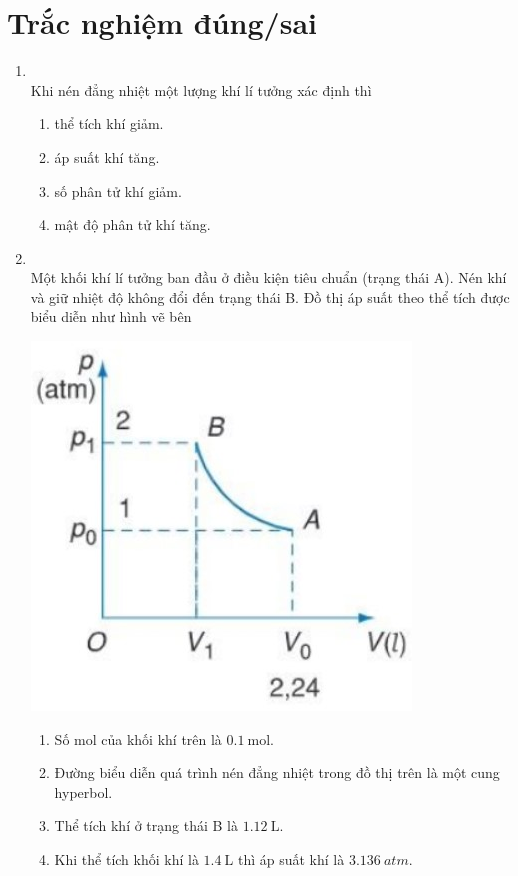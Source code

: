 \section{Trắc nghiệm đúng/sai}
\begin{enumerate}[label=\bfseries Câu \arabic*:, leftmargin=1.7cm]
	\item {}\\
	Khi nén đẳng nhiệt một lượng khí lí tưởng xác định thì
	\begin{enumerate}[label=\alph*)]
		\item thể tích khí giảm.
		\item áp suất khí tăng.
		\item số phân tử khí giảm.
		\item mật độ phân tử khí tăng.
	\end{enumerate}

\item{}\\
Một khối khí lí tưởng ban đầu ở điều kiện tiêu chuẩn (trạng thái A). Nén khí và giữ nhiệt độ không đổi đến trạng thái B. Đồ thị áp suất theo thể tích được biểu diễn như hình vẽ bên
\begin{center}
	\includegraphics[width=0.35\linewidth]{../figs/VN12-Y24-PH-SYL-010P-11}
\end{center}
\begin{enumerate}[label=\alph*)]
	\item Số mol của khối khí trên là $\SI{0.1}{\mole}$.
	\item Đường biểu diễn quá trình nén đẳng nhiệt trong đồ thị trên là một cung hyperbol.
	\item Thể tích khí ở trạng thái B là $\SI{1.12}{\liter}$.
	\item Khi thể tích khối khí là $\SI{1.4}{\liter}$ thì áp suất khí là $\SI{3.136}{atm}$.
\end{enumerate}


\end{enumerate}
